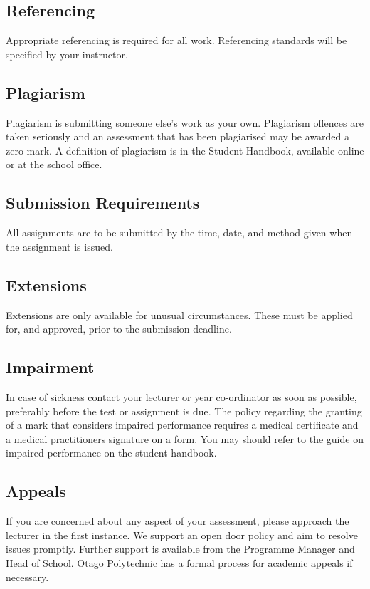 \documentclass{article}
\begin{document}
\subsection*{Referencing}
Appropriate referencing is required for all work.  Referencing standards will be specified by your instructor.

\subsection*{Plagiarism}
Plagiarism is submitting someone else's work as your own.  Plagiarism offences are taken seriously and an
assessment that has been plagiarised may be awarded a zero mark.  A definition of plagiarism is in the Student Handbook,
available online or at the school office.

\subsection*{Submission Requirements}
All assignments are to be submitted by the time, date, and method given when the assignment is issued.

\subsection*{Extensions}
Extensions are only available for unusual circumstances.  These must be applied for, and approved, prior to the submission deadline.

\subsection*{Impairment}
In case of sickness contact your lecturer or year co-ordinator as soon as possible, preferably before the test or
assignment is due.  The policy regarding the granting of a mark that considers impaired performance requires a medical
certificate and a medical practitioners signature on a form. You may should refer to the guide on impaired performance
on the student handbook.

\subsection*{Appeals}
If you are concerned about any aspect of your assessment, please approach the lecturer in the first instance.  We support
an open door policy and aim to resolve issues promptly.  Further support is available from the Programme
Manager and Head of School. Otago Polytechnic has a formal process for academic appeals if necessary.
\end{document}

